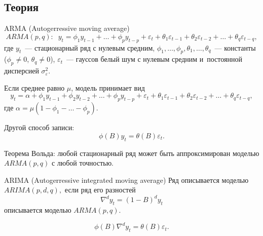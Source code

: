 \documentclass[9pt,pdf,utf8,hyperref={unicode},aspectratio=169]{beamer}
\begin{document}
\subsection{Теория}

\begin{frame}{ARMA (Autogerressive moving average)}
    $$ARMA(p,q)\colon \;\; y_t = \phi_1 y_{t-1} + \dots + \phi_p y_{t-p} + \varepsilon_t + \theta_1\varepsilon_{t-1} + \theta_2\varepsilon_{t-2} + \dots + \theta_q \varepsilon_{t-q},$$
    где $y_t$~--- стационарный ряд с нулевым средним, $\phi_1,\dots,\phi_p,\theta_1,\dots,\theta_q$~--- константы ($\phi_p \neq 0$, $\theta_q\neq0$), $\varepsilon_t$~--- гауссов белый шум с нулевым средним и~постоянной дисперсией $\sigma_\varepsilon^2.$

    \bigskip

    Если среднее равно $\mu$, модель принимает вид
    $$y_t = \alpha + \phi_1y_{t-1} + \phi_2 y_{t-2} + \dots + \phi_p y_{t-p} + \varepsilon_t + \theta_1\varepsilon_{t-1} + \theta_2\varepsilon_{t-2} + \dots + \theta_q \varepsilon_{t-q},$$
    где $\alpha=\mu\left(1-\phi_1-\dots-\phi_p\right).$

    \bigskip

    Другой способ записи:
    $$\phi\left(B\right)y_t = \theta\left(B\right)\varepsilon_t.$$

    \bigskip

    Теорема Вольда: любой стационарный ряд может быть аппроксимирован моделью $ARMA(p,q)$ с любой точностью.
\end{frame}

\begin{frame}{ARIMA (Autogerressive integrated moving average)}
    Ряд описывается моделью $ARIMA(p,d,q),$ если ряд его разностей $$\nabla^d y_t = \left(1-B\right)^d y_t$$ описывается моделью $ARMA(p,q)$.

    $$\phi\left(B\right)\nabla^d y_t = \theta\left(B\right)\varepsilon_t.$$
\end{frame}
\end{document}
